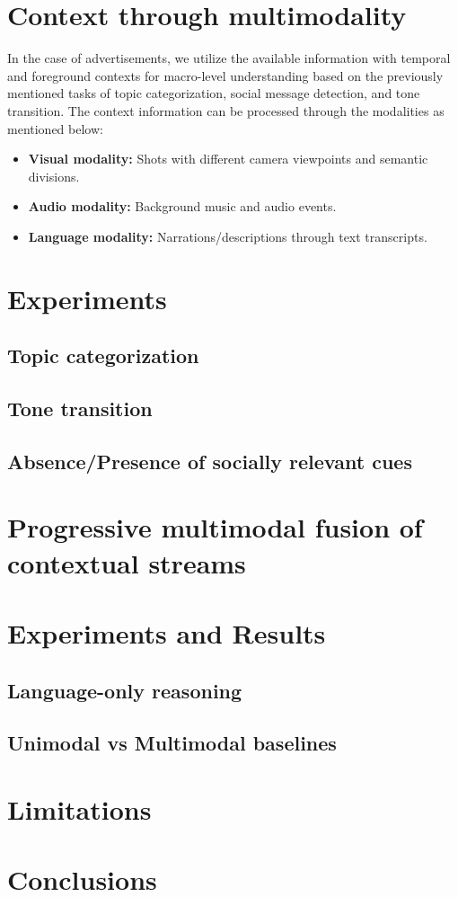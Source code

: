 \section{Context through multimodality}
In the case of advertisements, we utilize the available information with temporal and foreground contexts for macro-level understanding based on the previously mentioned tasks of topic categorization, social message detection, and tone transition. The context information can be processed through the modalities as mentioned below:
\begin{itemize}
    \item \textbf{Visual modality:} Shots with different camera viewpoints and semantic divisions.
    \item \textbf{Audio modality:} Background music and audio events.
    \item \textbf{Language modality:} Narrations/descriptions through text transcripts.
\end{itemize}
\section{Experiments}
\subsection{Topic categorization}
\subsection{Tone transition}
\subsection{Absence/Presence of socially relevant cues}
\section{Progressive multimodal fusion of contextual streams}
\section{Experiments and Results}
\subsection{Language-only reasoning}
\subsection{Unimodal vs Multimodal baselines}
\section{Limitations}
\section{Conclusions}





